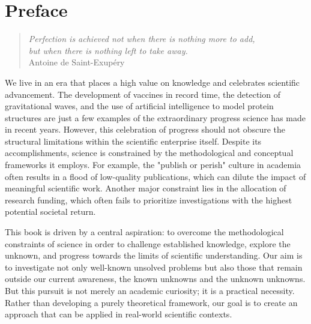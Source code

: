 %
%


\chapter*{Preface}

\begin{quote}
\begin{flushright}
\emph{Perfection is achieved not when there is nothing more to add, \\
but when there is nothing left to take away.}\\
Antoine de Saint-Exupéry\\
\end{flushright}
\end{quote}
\bigskip

%
%

We live in an era that places a high value on knowledge and celebrates scientific advancement. The development of vaccines in record time, the detection of gravitational waves, and the use of artificial intelligence to model protein structures are just a few examples of the extraordinary progress science has made in recent years. However, this celebration of progress should not obscure the structural limitations within the scientific enterprise itself. Despite its accomplishments, science is constrained by the methodological and conceptual frameworks it employs. For example, the "publish or perish" culture in academia often results in a flood of low-quality publications, which can dilute the impact of meaningful scientific work. Another major constraint lies in the allocation of research funding, which often fails to prioritize investigations with the highest potential societal return.

This book is driven by a central aspiration: to overcome the methodological constraints of science in order to challenge established knowledge, explore the unknown, and progress towards the limits of scientific understanding. Our aim is to investigate not only well-known unsolved problems but also those that remain outside our current awareness, the known unknowns and the unknown unknowns. But this pursuit is not merely an academic curiosity; it is a practical necessity. Rather than developing a purely theoretical framework, our goal is to create an approach that can be applied in real-world scientific contexts.


